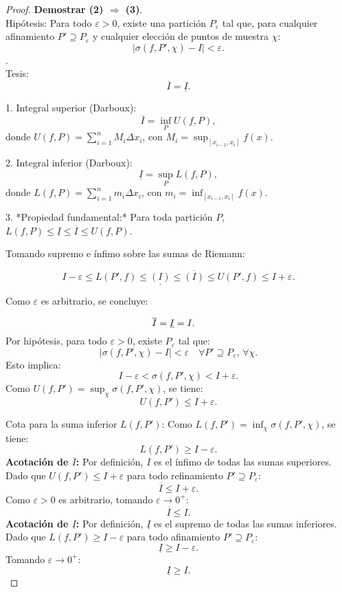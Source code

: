 \documentclass{article}
\begin{document}
	\begin{proof}\textbf{Demostrar (2) \(\Rightarrow\) (3)}.\\
	Hipótesis: 
	Para todo \( \varepsilon > 0 \), existe una partición \( P_\varepsilon \) tal que, para cualquier afinamiento \( P' \supseteq P_\varepsilon \) y cualquier elección de puntos de muestra \( \chi \):  
	\[
	|\sigma(f, P', \chi) - I| < \varepsilon.
	\].\\
	Tesis: 
	\[
	\overline{I} = \underline{I}.
	\]
	
	1. Integral superior (Darboux):
	\[
	\overline{I} = \inf_{P} U(f, P),
	\]  
	donde \( U(f, P) = \sum_{i=1}^n M_i \Delta x_i \), con \( M_i = \sup_{[x_{i-1}, x_i]} f(x) \).  
	
	2. Integral inferior (Darboux): 
	\[
	\underline{I} = \sup_{P} L(f, P),
	\]  
	donde \( L(f, P) = \sum_{i=1}^n m_i \Delta x_i \), con \( m_i = \inf_{[x_{i-1}, x_i]} f(x) \).  
	
	3. *Propiedad fundamental:*  
	Para toda partición \( P \), \( L(f, P) \leq \underline{I} \leq \overline{I} \leq U(f, P) \).  
	
	
		
		
		Tomando supremo e ínfimo sobre las sumas de Riemann:
		
		
		\[
		I - \varepsilon \leq L(P', f) \leq \underline{(I)}  \leq \overline{(I)}  \leq U(P', f) \leq I + \varepsilon.
		\]
		
		
		Como \( \varepsilon \) es arbitrario, se concluye:
		
		
		\[
		\overline{I} = \underline{I} = I. \quad \qedhere
		\]
		Por hipótesis, para todo \( \varepsilon > 0 \), existe \( P_\varepsilon \) tal que:  
		\[
		|\sigma(f, P', \chi) - I| < \varepsilon \quad \forall P' \supseteq P_\varepsilon, \, \forall \chi.
		\]  
		Esto implica:  
		\[
		I - \varepsilon < \sigma(f, P', \chi) < I + \varepsilon.
		\]  
		Como \( U(f, P') = \sup_{\chi} \sigma(f, P', \chi) \), se tiene:  
		\[
		U(f, P') \leq I + \varepsilon.
		\]  
		
		Cota para la suma inferior \( L(f, P') \):
		Como \( L(f, P') = \inf_{\chi} \sigma(f, P', \chi) \), se tiene:  
		\[
		L(f, P') \geq I - \varepsilon.
		\]  
		\textbf{Acotación de \( \overline{I} \):}
		Por definición, \( \overline{I} \) es el ínfimo de todas las sumas superiores. Dado que \( U(f, P') \leq I + \varepsilon \) para todo refinamiento \( P' \supseteq P_\varepsilon \):  
		\[
		\overline{I} \leq I + \varepsilon.
		\]  
		Como \( \varepsilon > 0 \) es arbitrario, tomando \( \varepsilon \to 0^+ \):  
		\[
		\overline{I} \leq I.
		\]  
		\textbf{Acotación de \( \underline{I} \):}
		Por definición, \( \underline{I} \) es el supremo de todas las sumas inferiores. Dado que \( L(f, P') \geq I - \varepsilon \) para todo afinamiento \( P' \supseteq P_\varepsilon \):  
		\[
		\underline{I} \geq I - \varepsilon.
		\]  
		Tomando \( \varepsilon \to 0^+ \):  
		\[
		\underline{I} \geq I.
		\]  
		

\end{proof}
\end{document}
